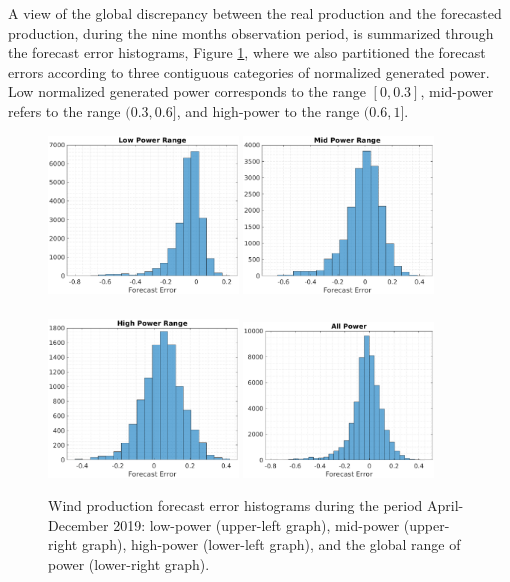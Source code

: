 \documentclass[11pt]{article}
\theoremstyle{definition}
\begin{document}
A view of the global discrepancy between the real production and the forecasted production, during the nine months observation period, is summarized through the forecast error histograms, Figure \ref{fig:data_curtailing}, where we also partitioned the forecast errors according to three contiguous categories of normalized generated power. Low normalized generated power corresponds to the range $[0,0.3]$, mid-power refers to the range $(0.3,0.6]$, and high-power to the range $(0.6,1]$.

\begin{figure}[H]
\centering
\includegraphics[width=0.45\textwidth]{plots/LP_6.eps}
\includegraphics[width=0.45\textwidth]{plots/MP_6.eps}\\
\quad\\
\includegraphics[width=0.45\textwidth]{plots/HP_6.eps}
\includegraphics[width=0.45\textwidth]{plots/AP_6.eps}
\caption{Wind production forecast error histograms during the period April-December 2019: low-power (upper-left graph), mid-power (upper-right graph), high-power (lower-left graph), and the global range of power (lower-right graph).}
  \label{fig:data_curtailing}
\end{figure}
\end{document}
